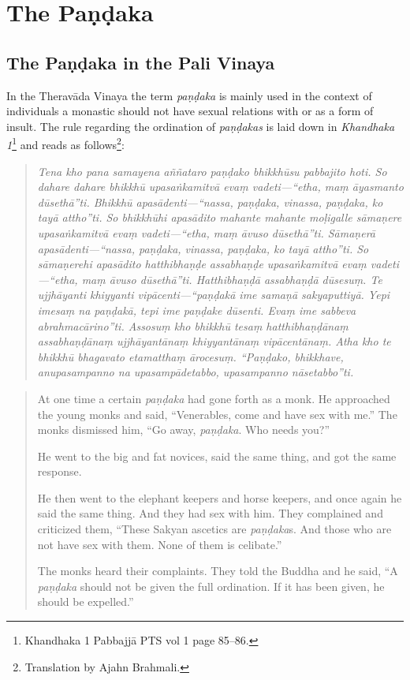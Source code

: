 \section{The Paṇḍaka}

\subsection{The Paṇḍaka in the Pali Vinaya}
In the Theravāda Vinaya the term {\em paṇḍaka} is mainly used in the context of individuals a monastic should not have sexual relations with or as a form of insult. The rule regarding the ordination of {\em paṇḍakas} is laid down in {\em Khandhaka 1}\footnote{Khandhaka 1 Pabbajjā PTS vol 1 page 85–86.} and reads as follows\footnote{Translation by Ajahn Brahmali.}:

\begin{quote}
{\em Tena kho pana samayena aññataro paṇḍako bhikkhūsu pabbajito hoti. So dahare dahare bhikkhū upasaṅkamitvā evaṃ vadeti—“etha, maṃ āyasmanto dūsethā”ti. Bhikkhū apasādenti—“nassa, paṇḍaka, vinassa, paṇḍaka, ko tayā attho”ti. So bhikkhūhi apasādito mahante mahante moḷigalle sāmaṇere upasaṅkamitvā evaṃ vadeti—“etha, maṃ āvuso dūsethā”ti. Sāmaṇerā apasādenti—“nassa, paṇḍaka, vinassa, paṇḍaka, ko tayā attho”ti. So sāmaṇerehi apasādito hatthibhaṇḍe assabhaṇḍe upasaṅkamitvā evaṃ vadeti—“etha, maṃ āvuso dūsethā”ti. Hatthibhaṇḍā assabhaṇḍā dūsesuṃ. Te ujjhāyanti khiyyanti vipācenti—“paṇḍakā ime samaṇā sakyaputtiyā. Yepi imesaṃ na paṇḍakā, tepi ime paṇḍake dūsenti. Evaṃ ime sabbeva abrahmacārino”ti. Assosuṃ kho bhikkhū tesaṃ hatthibhaṇḍānaṃ assabhaṇḍānaṃ ujjhāyantānaṃ khiyyantānaṃ vipācentānaṃ. Atha kho te bhikkhū bhagavato etamatthaṃ ārocesuṃ. “Paṇḍako, bhikkhave, anupasampanno na upasampādetabbo, upasampanno nāsetabbo”ti.}
\end{quote}

\begin{quote}
At one time a certain {\em paṇḍaka} had gone forth as a monk. He approached the young monks and said, “Venerables, come and have sex with me.” The monks dismissed him, “Go away, {\em paṇḍaka}. Who needs you?”

He went to the big and fat novices, said the same thing, and got the same response.

He then went to the elephant keepers and horse keepers, and once again he said the same thing. And they had sex with him. They complained and criticized them, “These Sakyan ascetics are {\em paṇḍaka}s. And those who are not have sex with them. None of them is celibate.”

The monks heard their complaints. They told the Buddha and he said, “A {\em paṇḍaka} should not be given the full ordination. If it has been given, he should be expelled.”
\end{quote}


